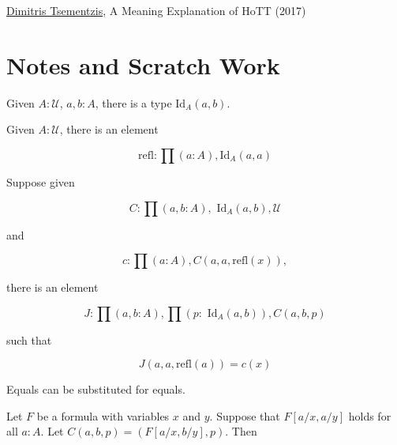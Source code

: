 \href{http://philsci-archive.pitt.edu/12824/1/A.Meaning.Explanation.for.HoTT.pdf}{Dimitris Tsementzis}, A Meaning Explanation of HoTT (2017)



\section{Notes and Scratch Work}

  Given $A:\mathcal{U}$, $a, b:A$, there is a type $\text{Id}_A(a,b)$.

 Given $A: \mathcal{U}$, there is an element 

$$
\text{refl}: \prod (a:A),\text{Id}_A(a,a)
$$

  Suppose given

$$
C: \prod(a,b:A), \text{ Id}_A(a,b), \mathcal{U}
$$

and 

$$
c : \prod (a:A), C(a,a,\text{refl}(x)),
$$

there is an element

$$
J: \prod (a,b:A), \prod (p: \text{ Id}_A(a,b)), C(a,b,p)
$$

such that

$$
J(a,a,\text{refl}(a)) = c(x)
$$


  Equals can be substituted for equals. 

 Let $F$ be a formula with variables $x$ and $y$.  Suppose that $F[a/x, a/y]$ holds for all $a:A$. Let $C(a,b,p) = (F[a/x, b/y], p)$. Then 
